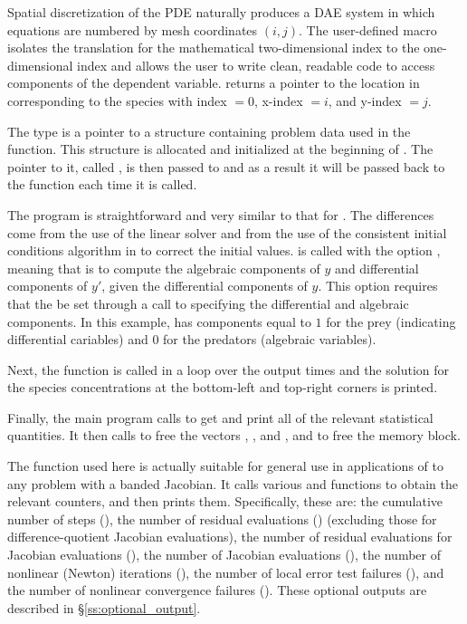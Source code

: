 Spatial discretization of the PDE naturally produces a DAE system in
which equations are numbered by mesh coordinates $(i,j)$. The
user-defined macro  isolates the translation for the
mathematical two-dimensional index to the one-dimensional
 index and allows the user to write clean, readable code
to access components of the dependent variable. 
 returns a pointer to the location in  corresponding to 
the species with index  $= 0$, x-index  $= i$, and y-index  $= j$.

The type  is a pointer to a structure containing problem
data used in the  function.  This structure is
allocated and initialized at the beginning of . The pointer
to it, called , is then passed to  and as a result 
it will be passed back to the  function each time it is called.

The  program is straightforward and very similar to that for .
The differences come from the use of the {\idaband} linear solver and from the
use of the consistent initial conditions algorithm in {\ida} to correct the initial
values.  is called with the option , meaning
that {\ida} is to compute the algebraic components of $y$ and differential  
components of $y'$, given the differential components of $y$.  
This option requires that the   be set through a call to 
 specifying the differential and algebraic components. In this example,
 has components equal to $1$ for the prey (indicating differential cariables)
and $0$ for the predators (algebraic variables).

Next, the  function is called in a loop over the output times
and the solution for the species concentrations at the bottom-left and
top-right corners is printed.

Finally, the main program calls  to get and print
all of the relevant statistical quantities.  It then calls 
to free the vectors , , and , and  to free the 
{\ida} memory block.

The function  used here is actually suitable for
general use in applications of {\ida} to any problem with a banded
Jacobian.  It calls various  and 
functions to obtain the relevant counters, and then prints them.
Specifically, these are: the cumulative number of steps (), 
the number of residual evaluations () (excluding those for
difference-quotient Jacobian evaluations),
the number of residual evaluations for Jacobian evaluations (),
the number of Jacobian evaluations (),
the number of nonlinear (Newton) iterations (),
the number of local error test failures (),
and the number of nonlinear convergence failures ().
These optional outputs are described in \S\ref{ss:optional_output}.

